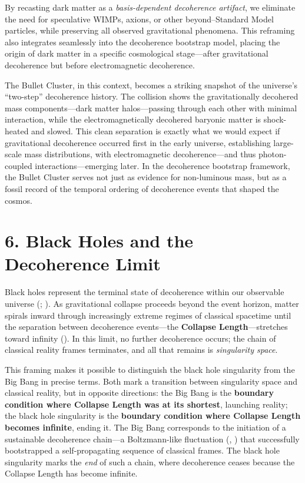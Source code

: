\documentclass[
]{article}
\begin{document}
By recasting dark matter as a \emph{basis-dependent decoherence
artifact}, we eliminate the need for speculative WIMPs, axions, or other
beyond--Standard Model particles, while preserving all observed
gravitational phenomena. This reframing also integrates seamlessly into
the decoherence bootstrap model, placing the origin of dark matter in a
specific cosmological stage---after gravitational decoherence but before
electromagnetic decoherence.

The Bullet Cluster, in this context, becomes a striking snapshot of the
universe's ``two-step'' decoherence history. The collision shows the
gravitationally decohered mass components---dark matter halos---passing
through each other with minimal interaction, while the
electromagnetically decohered baryonic matter is shock-heated and
slowed. This clean separation is exactly what we would expect if
gravitational decoherence occurred first in the early universe,
establishing large-scale mass distributions, with electromagnetic
decoherence---and thus photon-coupled interactions---emerging later. In
the decoherence bootstrap framework, the Bullet Cluster serves not just
as evidence for non-luminous mass, but as a fossil record of the
temporal ordering of decoherence events that shaped the cosmos.

\section{6. Black Holes and the Decoherence
Limit}\label{black-holes-and-the-decoherence-limit}

Black holes represent the terminal state of decoherence within our
observable universe (;
). As gravitational
collapse proceeds beyond the event horizon, matter spirals inward
through increasingly extreme regimes of classical spacetime until the
separation between decoherence events---the \textbf{Collapse
Length}---stretches toward infinity (). In this limit, no further decoherence occurs; the chain of
classical reality frames terminates, and all that remains is
\emph{singularity space}.

This framing makes it possible to distinguish the black hole singularity
from the Big Bang in precise terms. Both mark a transition between
singularity space and classical reality, but in opposite directions: the
Big Bang is the \textbf{boundary condition where Collapse Length was at
its shortest}, launching reality; the black hole singularity is the
\textbf{boundary condition where Collapse Length becomes infinite},
ending it. The Big Bang corresponds to the initiation of a sustainable
decoherence chain---a Boltzmann-like fluctuation
(,
) that successfully
bootstrapped a self-propagating sequence of classical frames. The black
hole singularity marks the \emph{end} of such a chain, where decoherence
ceases because the Collapse Length has become infinite.
\end{document}
